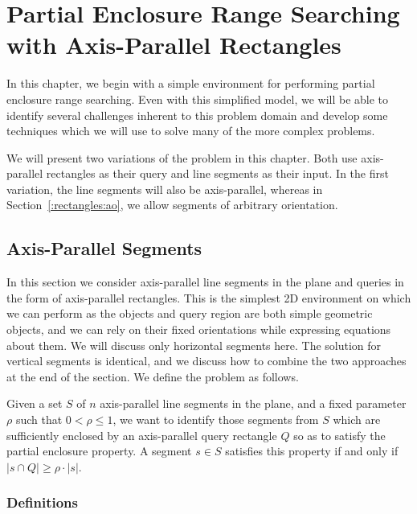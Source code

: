 \chapter{Partial Enclosure Range Searching with Axis-Parallel Rectangles}
\label{:rectangles}

In this chapter, we begin with a simple environment for performing partial enclosure range searching. 
Even with this simplified model, we will be able to identify several challenges inherent to this problem domain and develop some techniques which we will use to solve many of the more complex problems.

We will present two variations of the \PERS{} problem in this chapter. 
Both use axis-parallel rectangles as their query and line segments as their input. 
In the first variation, the line segments will also be axis-parallel, whereas in Section~\ref{:rectangles:ao}, we allow segments of arbitrary orientation.

\section{Axis-Parallel Segments}
\label{:rectangles:ap}

In this section we consider axis-parallel line segments in the plane and queries in the form of axis-parallel rectangles.
This is the simplest 2D environment on which we can perform \PERS{} as the objects and query region are both simple geometric objects, and we can rely on their fixed orientations while expressing equations about them. 
We will discuss only horizontal segments here.
The solution for vertical segments is identical, and we discuss how to combine the two approaches at the end of the section. We define the problem as follows.

\begin{problem}
Given a set $S$ of $n$ axis-parallel line segments in the plane, and a fixed parameter $\rho$ such that $0 < \rho \leq 1$, we want to identify those segments from $S$ which are sufficiently enclosed by an axis-parallel query rectangle $Q$ so as to satisfy the partial enclosure property. 
A segment $s \in S$ satisfies this property if and only if $|s \cap Q| \geq \rho \cdot |s|$.
\end{problem}


\subsection{Definitions}
\label{:rectangles:ap:defs}

